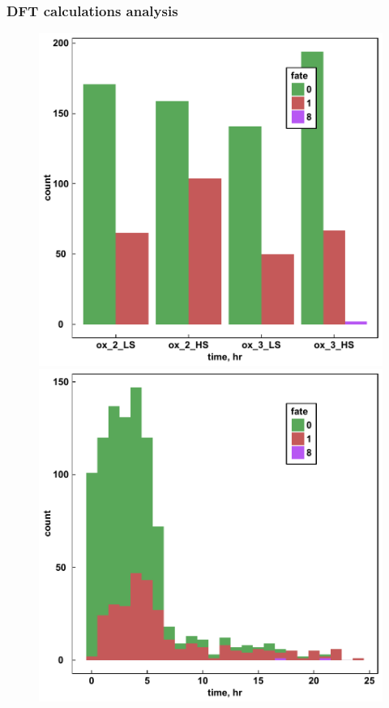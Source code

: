 \documentclass[xcolor=dvipsnames]{beamer}
\begin{document}
\begin{frame}
\frametitle{DFT calculations analysis}
\begin{figure}[ht] 
	\begin{minipage}[b]{0.5\linewidth}
		\centering
		\includegraphics[width=.8\linewidth]{img/fateBytype.pdf} 
	\end{minipage}%
	\begin{minipage}[b]{0.5\linewidth}
		\centering
		\includegraphics[width=.8\linewidth]{img/timeByfate.pdf} 
	\end{minipage} 
\end{figure}
\end{frame}
\end{document}
